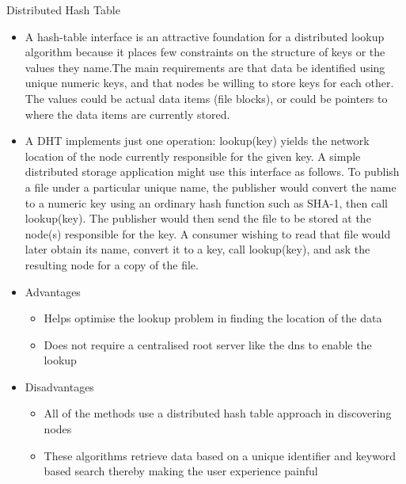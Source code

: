 \documentclass[9pt]{beamer}
\begin{document}
\begin{frame}{Distributed Hash Table}
    \begin{itemize}
    \item A  hash-table  interface  is an  attractive  foundation for  a  distributed  lookup algorithm because it places  few  constraints  on the  structure  of  keys  or the values they name.The main requirements are that data be identified using unique numeric keys,  and  that  nodes be willing to store keys for each other. The values could be actual data items (file blocks), or could be pointers to where the data items are currently stored.
    \item A DHT implements just one operation:
lookup(key) yields  the  network  location  of  the
node currently responsible for the given key. A simple  distributed  storage  application  might  use  this interface as follows. To publish a file under a particular  unique  name,  the  publisher  would  convert  the name to a numeric key using an ordinary hash function  such  as  SHA-1,  then  call  lookup(key).  The publisher would then send the file to be stored at the node(s) responsible for the key. A consumer wishing to read that file would later obtain its name, convert it  to  a  key,  call  lookup(key),  and  ask  the  resulting
node for a copy of the file.
    \end{itemize}
\end{frame}
\begin{frame}
    \begin{itemize}
        \item Advantages
        \begin{itemize}
            \item Helps optimise the lookup problem in finding the location of the data
\item Does not require a centralised root server like the dns to enable the lookup 

        \end{itemize}
        \break
        \item Disadvantages
        \begin{itemize}
            \item All of the methods use a distributed hash table approach in discovering nodes
\item These algorithms retrieve data based on a unique identifier and keyword based search thereby making the user experience painful
        \end{itemize}
    \end{itemize}
\end{frame}
\end{document}
